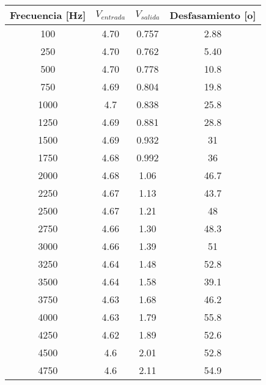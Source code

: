 \documentclass{article}
\begin{document}
\begin{table}[h!]
\centering

\begin{tabular}{|c|c|c|c|}
\hline
Frecuencia {[}Hz{]} & $V_{entrada}$ & $V_{salida}$ & Desfasamiento  [o]\\ \hline
100                 & 4.70          & 0.757        & 2.88          \\ \hline
250                 & 4.70          & 0.762        & 5.40          \\ \hline
500                 & 4.70          & 0.778        & 10.8          \\ \hline
750                 & 4.69          & 0.804        & 19.8          \\ \hline
1000                & 4.7           & 0.838        & 25.8          \\ \hline
1250                & 4.69          & 0.881        & 28.8          \\ \hline
1500                & 4.69          & 0.932        & 31            \\ \hline
1750                & 4.68          & 0.992        & 36            \\ \hline
2000                & 4.68          & 1.06         & 46.7          \\ \hline
2250                & 4.67          & 1.13         & 43.7          \\ \hline
2500                & 4.67          & 1.21         & 48            \\ \hline
2750                & 4.66          & 1.30         & 48.3          \\ \hline
3000                & 4.66          & 1.39         & 51            \\ \hline
3250                & 4.64          & 1.48         & 52.8          \\ \hline
3500                & 4.64          & 1.58         & 39.1          \\ \hline
3750                & 4.63          & 1.68         & 46.2          \\ \hline
4000                & 4.63          & 1.79         & 55.8          \\ \hline
4250                & 4.62          & 1.89         & 52.6          \\ \hline
4500                & 4.6           & 2.01         & 52.8          \\ \hline
4750                & 4.6           & 2.11         & 54.9          \\ \hline

\end{tabular}
\end{table}
\end{document}
